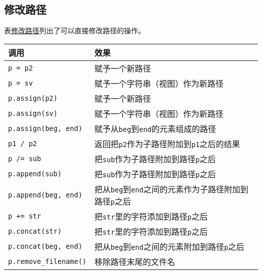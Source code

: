 \subsection{修改路径}\label{ch20.3.5}
表\hyperref[t20.7]{修改路径}列出了可以直接修改路径的操作。
\begin{table}[ht]
    \centering
    \begin{tabular}{l|l}
        \hline
        \textbf{调用}                         & \textbf{效果}                                            \\
        \hline
        \texttt{p = p2}                     & 赋予一个新路径                                                \\
        \texttt{p = sv}                     & 赋予一个字符串（视图）作为新路径                                       \\
        \texttt{p.assign(p2)}               & 赋予一个新路径                                                \\
        \texttt{p.assign(sv)}               & 赋予一个字符串（视图）作为新路径                                       \\
        \texttt{p.assign(beg, end)}         & 赋予从\texttt{beg}到\texttt{end}的元素组成的路径                   \\
        \texttt{p1 / p2}                    & 返回把\texttt{p2}作为子路径附加到\texttt{p1}之后的结果                 \\
        \texttt{p /= sub}                   & 把\texttt{sub}作为子路径附加到路径\texttt{p}之后                    \\
        \texttt{p.append(sub)}              & 把\texttt{sub}作为子路径附加到路径\texttt{p}之后                    \\
        \texttt{p.append(beg, end)}         & 把从\texttt{beg}到\texttt{end}之间的元素作为子路径附加到路径\texttt{p}之后 \\
        \texttt{p += str}                   & 把\texttt{str}里的字符添加到路径\texttt{p}之后                     \\
        \texttt{p.concat(str)}              & 把\texttt{str}里的字符添加到路径\texttt{p}之后                     \\
        \texttt{p.concat(beg, end)}         & 把从\texttt{beg}到\texttt{end}之间的元素附加到路径\texttt{p}之后      \\
        \texttt{p.remove\_filename()}       & 移除路径末尾的文件名                                             \\

\end{tabular}
\end{table}
